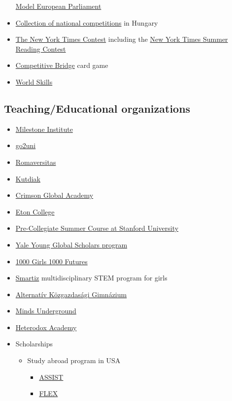 \documentclass{article}
\begin{document}
\begin{itemize}
    \href{https://mepeurope.eu/}{Model European Parliament}
    \item \href{https://tanulmanyiversenyek.hu/}{Collection of national competitions} in Hungary
    \item \href{https://www.nytimes.com/spotlight/learning-contests}{The New York Times Contest} including the \href{https://www.nytimes.com/2021/04/16/learning/our-12th-annual-summer-reading-contest.html}{New York Times Summer Reading Contest}
    \item \href{http://youth.worldbridge.org/}{Competitive Bridge} card game
    \item \href{https://worldskills.org/}{World Skills}
\end{itemize}

\subsection{Teaching/Educational organizations}

\begin{itemize}
    \item \href{https://milestone-institute.org/}{Milestone Institute}
    \item \href{https://www.euroexam.org/go2uni}{go2uni}
    \item \href{https://romaversitas.hu/en/}{Romaversitas}
    \item \href{https://www.kutdiak.hu/en/}{Kutdiak}
    \item \href{https://www.crimsonglobalacademy.school/uk/}{Crimson Global Academy}
    \item \href{https://www.etoncollege.com/}{Eton College}
    \item \href{https://summerinstitutes.spcs.stanford.edu/}{Pre-Collegiate Summer Course at Stanford University}
    \item \href{https://globalscholars.yale.edu/}{Yale Young Global Scholars program}
    \item \href{https://www.nyas.org/programs/global-stem-alliance/1000-girls-1000-futures/}{1000 Girls 1000 Futures}
    \item \href{https://nokatud.hu/smartiz/}{Smartiz} multidisciplinary STEM program for girls
    \item \href{https://www.akg.hu/}{Alternatív Közgazdasági Gimnázium}
    \item \href{https://www.mindsunderground.com/}{Minds Underground}
    \item \href{https://heterodoxacademy.org/}{Heterodox Academy}
    
    \item Scholarships
    \begin{itemize}
        \item Study abroad program in USA
        \begin{itemize}
            \item \href{https://www.assistscholars.org/en/index}{ASSIST}
            \item \href{https://www.discoverflex.org/}{FLEX}
        \end{itemize}
    \end{itemize}
\end{itemize}
\end{document}
